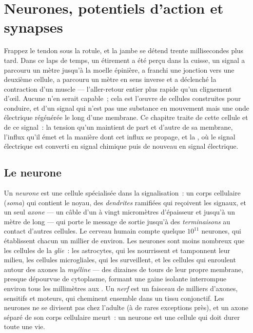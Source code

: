 \chapter{Neurones, potentiels d'action et synapses}\label{ch:b2:neurons-synapses}

Frappez le tendon sous la rotule, et la jambe se détend trente
millisecondes plus tard. Dans ce laps de temps, un étirement a été perçu
dans la cuisse, un signal a parcouru un mètre jusqu'à la moelle
épinière, a franchi une jonction vers une deuxième cellule, a parcouru
un mètre en sens inverse et a déclenché la contraction d'un muscle ---
l'aller-retour entier plus rapide qu'un clignement d'œil. Aucune
 n'en serait capable~; cela est l'œuvre de cellules construites
pour conduire, et d'un signal qui n'est pas une substance en mouvement
mais une onde électrique régénérée le long d'une membrane. Ce chapitre
traite de cette cellule et de ce signal~: la tension qu'un 
maintient de part et d'autre de sa membrane, l'influx qu'il émet et la
manière dont cet influx se propage, et la , où le signal
électrique est converti en signal chimique puis de nouveau en signal
électrique.

\section{Le neurone}

\begin{definition}\label{def:b2:neurons-synapses:neuron}
Un \emph{neurone} est une cellule spécialisée dans la signalisation~: un
corps cellulaire (\emph{soma}) qui contient le noyau, des
\emph{dendrites} ramifiées qui reçoivent les signaux, et un seul
\emph{axone} --- un câble d'un à vingt micromètres d'épaisseur et
jusqu'à un mètre de long --- qui porte le message de sortie jusqu'à des
\emph{terminaisons} au contact d'autres cellules. Le cerveau humain
compte quelque $10^{11}$ neurones, qui établissent chacun un millier de
 environ. Les neurones sont moins nombreux que les cellules de la
\emph{glie}~: les astrocytes, qui les nourrissent et tamponnent leur
milieu, les cellules microgliales, qui les surveillent, et les cellules
qui enroulent autour des axones la \emph{myéline} --- des dizaines de
tours de leur propre membrane, presque dépourvue de cytoplasme, formant
une gaine isolante interrompue environ tous les millimètres aux
\emph{}. Un \emph{nerf} est un faisceau de milliers
d'axones, sensitifs et moteurs, qui cheminent ensemble dans un tissu
conjonctif. Les neurones ne se divisent pas chez l'adulte (à de rares
exceptions près), et un axone séparé de son corps cellulaire meurt~: un
neurone est une cellule qui doit durer toute une vie.
\end{definition}

